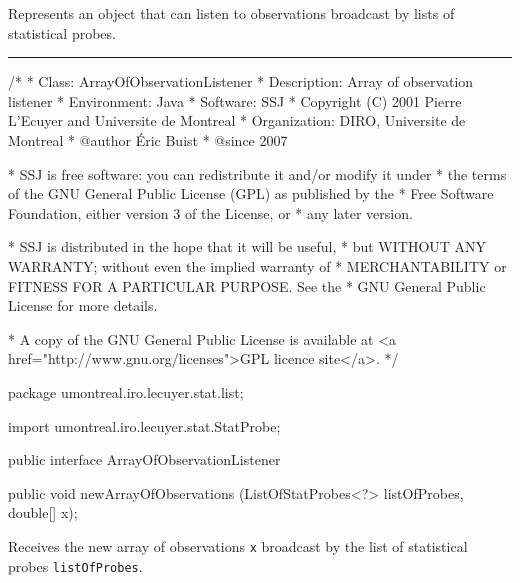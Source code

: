 
Represents an object that can listen to observations broadcast
by lists of statistical probes.

\bigskip\hrule

\begin{code}\begin{hide}
/*
 * Class:        ArrayOfObservationListener
 * Description:  Array of observation listener
 * Environment:  Java
 * Software:     SSJ 
 * Copyright (C) 2001  Pierre L'Ecuyer and Universite de Montreal
 * Organization: DIRO, Universite de Montreal
 * @author       Éric Buist 
 * @since        2007

 * SSJ is free software: you can redistribute it and/or modify it under
 * the terms of the GNU General Public License (GPL) as published by the
 * Free Software Foundation, either version 3 of the License, or
 * any later version.

 * SSJ is distributed in the hope that it will be useful,
 * but WITHOUT ANY WARRANTY; without even the implied warranty of
 * MERCHANTABILITY or FITNESS FOR A PARTICULAR PURPOSE.  See the
 * GNU General Public License for more details.

 * A copy of the GNU General Public License is available at
   <a href="http://www.gnu.org/licenses">GPL licence site</a>.
 */
\end{hide}
package umontreal.iro.lecuyer.stat.list;
\begin{hide}
import umontreal.iro.lecuyer.stat.StatProbe;
\end{hide}

public interface ArrayOfObservationListener\begin{hide} {\end{hide}

   public void newArrayOfObservations (ListOfStatProbes<?> listOfProbes,
                                       double[] x);
\end{code}
\begin{tabb}  Receives the new array of observations \texttt{x} broadcast by the
   list of statistical probes \texttt{listOfProbes}.
\end{tabb}
\begin{htmlonly}
\end{htmlonly}
\begin{code}\begin{hide}
}\end{hide}
\end{code}
